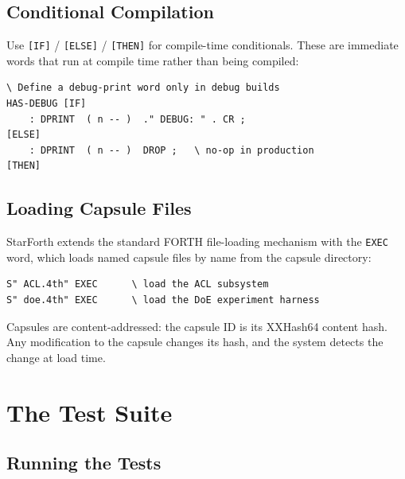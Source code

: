 \section{Conditional Compilation}
\label{sec:conditional-compile}

Use \texttt{[IF]} / \texttt{[ELSE]} / \texttt{[THEN]} for compile-time
conditionals. These are immediate words that run at compile time rather than
being compiled:

\begin{lstlisting}[language=Forth]
\ Define a debug-print word only in debug builds
HAS-DEBUG [IF]
    : DPRINT  ( n -- )  ." DEBUG: " . CR ;
[ELSE]
    : DPRINT  ( n -- )  DROP ;   \ no-op in production
[THEN]
\end{lstlisting}

\section{Loading Capsule Files}
\label{sec:loading-capsules}

StarForth extends the standard FORTH file-loading mechanism with the
\texttt{EXEC} word, which loads named capsule files by name from the capsule
directory:

\begin{lstlisting}[language=Forth]
S" ACL.4th" EXEC      \ load the ACL subsystem
S" doe.4th" EXEC      \ load the DoE experiment harness
\end{lstlisting}

Capsules are content-addressed: the capsule ID is its XXHash64 content hash.
Any modification to the capsule changes its hash, and the system detects the
change at load time.

\chapter{The Test Suite}
\label{chap:tests}

\section{Running the Tests}
\label{sec:running-tests}

